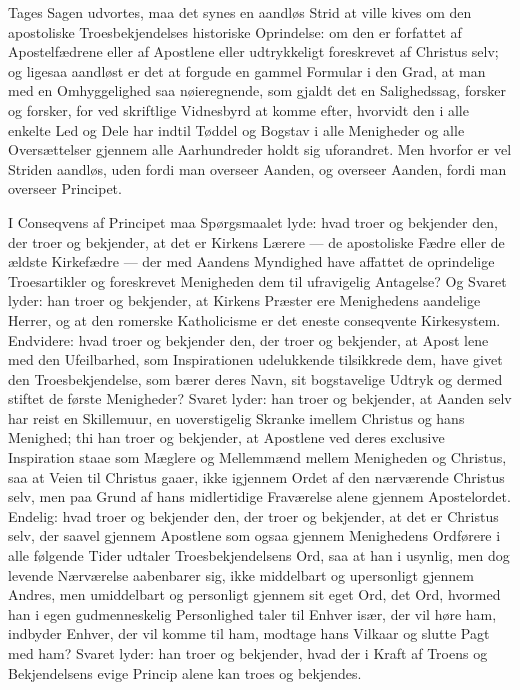 \documentclass[12pt]{book}
\begin{document}
Tages Sagen udvortes, maa det synes en aandløs Strid at ville kives
om den apostoliske Troesbekjendelses historiske Oprindelse: om den
er forfattet af Apostelfædrene eller af Apostlene eller udtrykkeligt
foreskrevet af Christus selv; og ligesaa aandløst er det at forgude
en gammel Formular i den Grad, at man med en Omhyggelighed saa
nøieregnende, som gjaldt det en Salighedssag, forsker og forsker,
for ved skriftlige Vidnesbyrd at komme efter, hvorvidt den i alle
enkelte Led og Dele har indtil Tøddel og Bogstav i alle Menigheder
og alle Oversættelser gjennem alle Aarhundreder holdt sig
uforandret. Men hvorfor er vel Striden aandløs, uden fordi man
overseer Aanden, og overseer Aanden, fordi man overseer Principet.

I Conseqvens af Principet maa Spørgsmaalet lyde: hvad troer og
bekjender den, der troer og bekjender, at det er Kirkens Lærere ---
de apostoliske Fædre eller de ældste Kirkefædre --- der med Aandens
Myndighed have affattet de oprindelige Troesartikler og foreskrevet
Menigheden dem til ufravigelig Antagelse? Og Svaret lyder: han troer
og bekjender, at Kirkens Præster ere Menighedens aandelige Herrer,
og at den romerske Katholicisme er det eneste conseqvente
Kirkesystem. Endvidere: hvad troer og bekjender den, der troer og
bekjender, at Apost\-
lene med den Ufeilbarhed, som Inspirationen udelukkende tilsikkrede
dem, have givet den Troesbekjendelse, som bærer deres Navn, sit
bogstavelige Udtryk og dermed stiftet de første Menigheder? Svaret
lyder: han troer og bekjender, at Aanden selv har reist en
Skillemuur, en uoverstigelig Skranke imellem Christus og hans
Menighed; thi han troer og bekjender, at Apostlene ved deres
exclusive Inspiration staae som Mæglere og Mellemmænd mellem
Menigheden og Christus, saa at Veien til Christus gaaer, ikke
igjennem Ordet af den nærværende Christus selv, men paa Grund af
hans midlertidige Fraværelse alene gjennem Apostelordet. Endelig:
hvad troer og bekjender den, der troer og bekjender, at det er
Christus selv, der saavel gjennem Apostlene som ogsaa gjennem
Menighedens Ordførere i alle følgende Tider udtaler
Troesbekjendelsens Ord, saa at han i usynlig, men dog levende
Nærværelse aabenbarer sig, ikke middelbart og upersonligt gjennem
Andres, men umiddelbart og personligt gjennem sit eget Ord, det Ord,
hvormed han i egen gudmenneskelig Personlighed taler til Enhver
især, der vil høre ham, indbyder Enhver, der vil komme til ham,
modtage hans Vilkaar og slutte Pagt med ham? Svaret lyder: han troer
og bekjender, hvad der i Kraft af Troens og Bekjendelsens evige
Princip alene kan troes og bekjendes.
\end{document}
